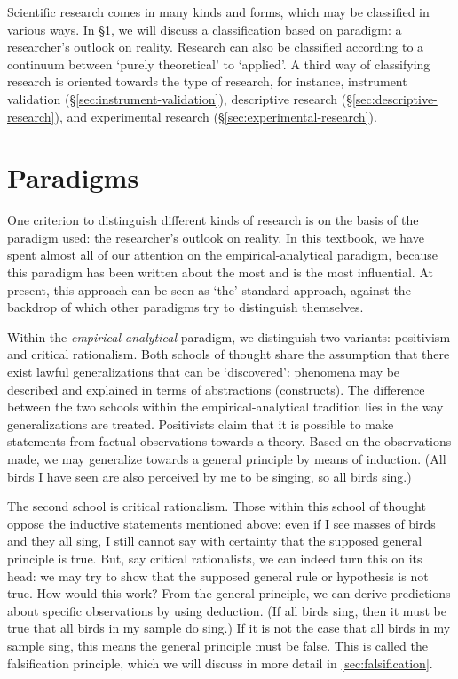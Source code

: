 \documentclass[
]{book}
\begin{document}
Scientific research comes in many kinds and forms, which may be classified in various ways. In §\ref{sec:paradigms}, we will discuss a classification based on paradigm: a researcher's outlook on reality. Research can also be classified according to a continuum between `purely theoretical' to `applied'. A third way of classifying research is oriented towards the type of research, for instance, instrument validation (§\ref{sec:instrument-validation}), descriptive research (§\ref{sec:descriptive-research}), and experimental research (§\ref{sec:experimental-research}).

\section{Paradigms}\label{sec:paradigms}

One criterion to distinguish different kinds of research is on the basis of the paradigm used: the researcher's outlook on reality. In this textbook, we have spent almost all of our attention on the empirical-analytical paradigm, because this paradigm has been written about the most and is the most influential. At present, this approach can be seen as `the' standard approach, against the backdrop of which other paradigms try to distinguish themselves.

Within the \emph{empirical-analytical} paradigm, we distinguish two variants: positivism and critical rationalism. Both schools of thought share the assumption that there exist lawful generalizations that can be `discovered': phenomena may be described and explained in terms of abstractions (constructs). The difference between the two schools within the empirical-analytical tradition lies in the way generalizations are treated. Positivists claim that it is possible to make statements from factual observations towards a theory. Based on the observations made, we may generalize towards a general principle by means of induction. (All birds I have seen are also perceived by me to be singing, so all birds sing.)

The second school is critical rationalism. Those within this school of thought oppose the inductive statements mentioned above: even if I see masses of birds and they all sing, I still cannot say with certainty that the supposed general principle is true. But, say critical rationalists, we can indeed turn this on its head: we may try to show that the supposed general rule or hypothesis is not true. How would this work? From the general principle, we can derive predictions about specific observations by using deduction. (If all birds sing, then it must be true that all birds in my sample do sing.) If it is not the case that all birds in my sample sing, this means the general principle must be false. This is called the falsification principle, which we will discuss in more detail in \ref{sec:falsification}.
\end{document}
